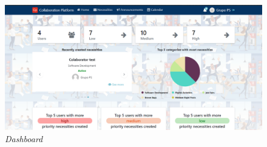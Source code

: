 \begin{figure}[H]
  \centering 
  \includegraphics[scale=0.4]{figures/Dashboard.png}
  \caption{\textit{Dashboard}}\label{fig:Dashboard}
\end{figure}


